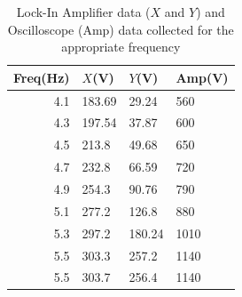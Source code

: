 \documentclass[12pt]{article}
\begin{document}
\begin{table}[!ht]
\centering
    \begin{tabular}{r|lll}
    Freq(Hz) & $X$(V)      & $Y$(V)      & Amp(V) \\
    \hline
    4.1  & 183.69 & 29.24  & 560 \\
    4.3  & 197.54 & 37.87  & 600 \\
    4.5  & 213.8  & 49.68  & 650 \\
    4.7  & 232.8  & 66.59  & 720 \\
    4.9  & 254.3  & 90.76  & 790 \\
    5.1  & 277.2  & 126.8  & 880 \\
    5.3  & 297.2  & 180.24 & 1010\\
    5.5  & 303.3  & 257.2  & 1140\\
    5.5  & 303.7  & 256.4  & 1140\\
    \end{tabular}
    \caption{Lock-In Amplifier data ($X$ and $Y$) and Oscilloscope (Amp) data collected for the appropriate frequency}
    \label{tab:lock_in_LRC}
\end{table}
    
    
\end{document}
